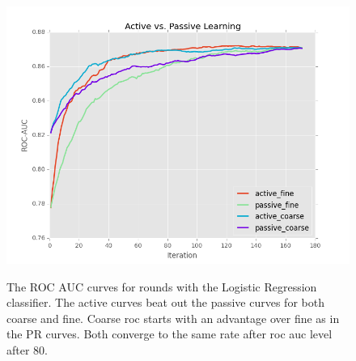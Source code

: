 \documentclass[ms]{nuthesis}
\begin{document}
\FloatBarrier
\begin{figure}[!htb]
	\centering
    \includegraphics[width=1.0\columnwidth]{fig/runActPassLogReg_roc}
    \label{fig:ActiveVsPassiveROCLR}
    \caption{The ROC AUC curves for rounds with the
Logistic Regression classifier. The active curves beat out the passive
curves for both coarse and fine. Coarse roc starts with an advantage over
fine as in the PR curves. Both converge to the same rate after roc auc level after 80.}
\end{figure}
\FloatBarrier

%
\end{document}
